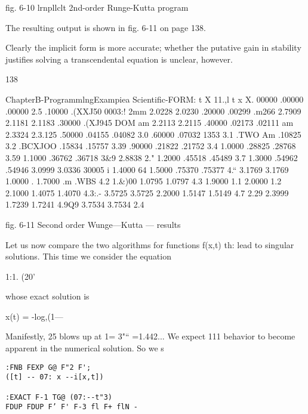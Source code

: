{{ 

 

 

 

fig. 6-10 lrnpllclt 2nd-order Runge-Kutta program

The resulting output is shown in fig. 6-11 on page 138.

Clearly the implicit form is more accurate; whether the putative gain
in stability justifies solving a transcendental equation is unclear,
however.

138

 

ChapterB-ProgrammlngExampiea Scientific-FORM:
t X 11.,l t x X.
00000 .00000 .00000 2.5%
.10000 .(XXJ50 0003:! 2mm 2.0228 2.0230
.20000 .00299 .m266 2.7909 2.1181 2.1183
.30000 .(XJ945 DOM am 2.2113 2.2115
.40000 .02173 .02111 am 2.3324 2.3.125
.50000 .04155 .04082 3.0%
.60000 .07032 1353 3.1%
.TWO Am .10825 3.2%
.BCXJOO .15834 .15757 3.39%
.90000 .21822 .21752 3.4%
1.0000 .28825 .28768 3.59%
1.1000 .36762 .36718 3&9 2.8838 2."
1.2000 .45518 .45489 3.7%
1.3000 .54962 .54946 3.0999 3.0336 30005 i
1.4000 64%
1.5000 .75370 .75377 4.“ 3.1769 3.1769
1.0000 .%
1.7000 .m .WBS 4.2%
1.&)00 1.0795 1.0797 4.3%
1.9000 1.1%
2.0000 1.2%
2.1000 1.4075 1.4070 4.3:.- 3.5725 3.5725
2.2000 1.5147 1.5149 4.7%
2.29%
2.3999 1.7239 1.7241 4.9Q9 3.7534 3.7534
2.4%

 

fig. 6-11 Second order Wunge—Kutta — results

Let us now compare the two algorithms for functions f(x,t) th:
lead to singular solutions. This time we consider the equation

1:1. (20'

whose exact solution is

x(t) = -log,(1—%

Manifestly, 25 blows up at 1= 3"“ =1.442... We expect 111
behavior to become apparent in the numerical solution. So we s

\begin{lstlisting}
:FNB FEXP G@ F"2 F';
([t] -- 07: x --i[x,t])

:EXACT F-1 TG@ (07:--t"3)
FDUP FDUP F’ F' F-3 fl F+ flN -
\end{lstlisting}

}}
